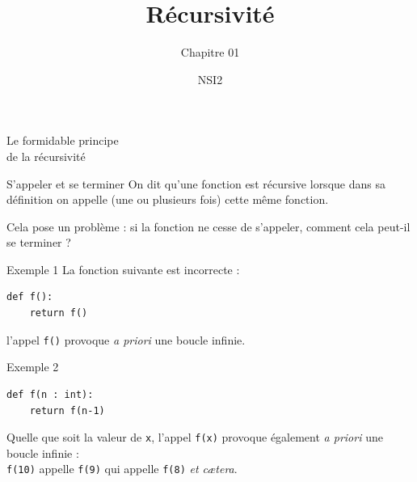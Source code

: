 \documentclass[10pt]{nsibeamer}
\title{Récursivité}
\subtitle{Chapitre 01}
\author{NSI2}
\begin{document}
\maketitle

\begin{frame}[standout]
    \begin{center}
        \Huge
        Le formidable principe\\
        
        de la récursivité
    \end{center}
\end{frame}

%

\begin{frame}{S'appeler et se terminer}
    On dit qu'une fonction est \alert{récursive} lorsque dans sa définition on appelle (une ou plusieurs fois)
    cette même fonction.\\\pause
    
    Cela pose un problème : si la fonction ne cesse de s'appeler, comment
    cela peut-il se terminer ?
\end{frame}

%

\begin{frame}[fragile]{Exemple 1}
    La fonction suivante est incorrecte :
    \begin{verbatim}
def f():
    return f()
\end{verbatim}
    \pause
    l'appel \texttt{f()} provoque \textit{a priori} une boucle infinie.
\end{frame}

%

\begin{frame}[fragile]{Exemple 2}
    \begin{verbatim}
def f(n : int):
    return f(n-1)
\end{verbatim}
    \pause
    Quelle que soit la valeur de \texttt{x}, l'appel \texttt{f(x)} provoque également \textit{a priori} une boucle infinie :\\\pause
    \texttt{f(10)} appelle \texttt{f(9)} qui appelle \texttt{f(8)} \textit{et c\ae tera}.
\end{frame}

%
\end{document}

